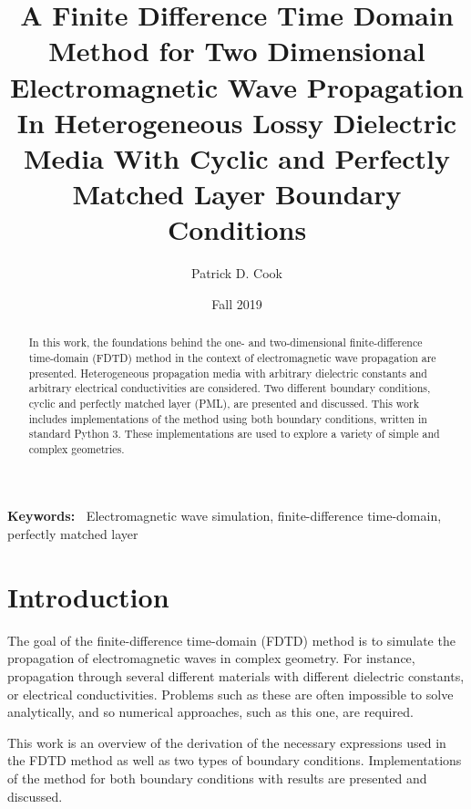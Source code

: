 \documentclass[12pt,twocolumn]{article}
\providecommand{\keywords}[1]{\textbf{\textbf{Keywords:~}} #1}
\begin{document}
\title{A Finite Difference Time Domain Method for Two Dimensional Electromagnetic Wave Propagation In Heterogeneous Lossy Dielectric Media With Cyclic and Perfectly Matched Layer Boundary Conditions}
\author{Patrick D. Cook}
\date{Fall 2019}
\begin{titlingpage}
\maketitle
\begin{abstract}
In this work, the foundations behind the one- and two-dimensional finite-difference time-domain (FDTD) method in the context of electromagnetic wave propagation are presented. Heterogeneous propagation media with arbitrary dielectric constants and arbitrary electrical conductivities are considered. Two different boundary conditions, cyclic and perfectly matched layer (PML), are presented and discussed. This work includes implementations of the method using both boundary conditions, written in standard Python 3. These implementations are used to explore a variety of simple and complex geometries.
\end{abstract}

\keywords{Electromagnetic wave simulation, finite-difference time-domain, perfectly matched layer}
\end{titlingpage}
\newpage
\section{Introduction}
The goal of the finite-difference time-domain (FDTD) method is to simulate the propagation of electromagnetic waves in complex geometry. For instance, propagation through several different materials with different dielectric constants, or electrical conductivities. Problems such as these are often impossible to solve analytically, and so numerical approaches, such as this one, are required.

This work is an overview of the derivation of the necessary expressions used in the FDTD method as well as two types of boundary conditions. Implementations of the method for both boundary conditions with results are presented and discussed.
\end{document}
